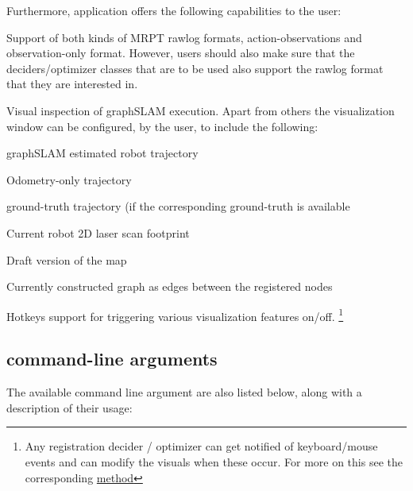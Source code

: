 Furthermore, application offers the following capabilities to the user:
\begin{itemize*}
    \item Support of both kinds of MRPT rawlog formats,
        action-observations and observation-only format. However, users should
        also make sure that the deciders/optimizer classes that are to be used
        also support the rawlog format that they are interested in.
    \item Visual inspection of graphSLAM execution. Apart from others the
        visualization window can be configured, by the user, to include the
        following:
        \begin{itemize*}
            \item graphSLAM estimated robot trajectory
            \item Odometry-only trajectory
            \item ground-truth trajectory (if the corresponding ground-truth is
                available
            \item Current robot 2D laser scan footprint
            \item Draft version of the map
            \item Currently constructed graph as edges between the registered
                nodes
        \end{itemize*}

    \item Hotkeys support for triggering various visualization features on/off.
        \footnote{Any registration decider / optimizer can get notified of
            keyboard/mouse events and can modify the visuals when these occur.
            For more on this see the corresponding
            \href{http://reference.mrpt.org/devel/classmrpt\_1\_1graphslam\_1\_1\_c\_registration\_decider\_or\_optimizer.html\#a3d8445d2382e282f3a03edfa686c6e22}{method}}

\end{itemize*}

\subsection{command-line arguments}

The available command line argument are also listed below, along with a
description of their usage:




